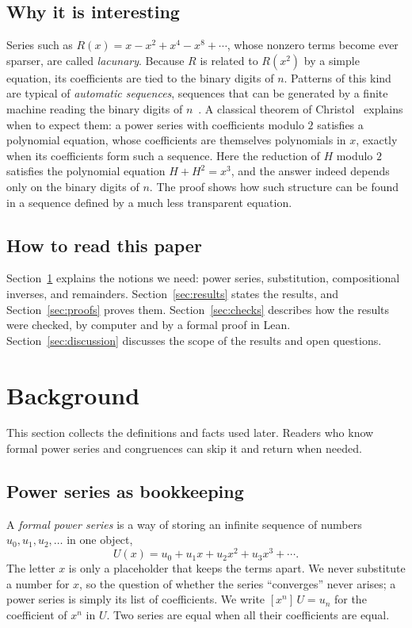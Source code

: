 \documentclass[11pt,a4paper]{article}
\theoremstyle{definition}
\theoremstyle{remark}
\newcommand{\coeff}[2]{[x^{#1}]\,#2}
\begin{document}
\subsection{Why it is interesting}
Series such as $R(x)=x-x^2+x^4-x^8+\cdots$, whose nonzero terms become ever sparser, are called \emph{lacunary}. Because
$R$ is related to $R(x^2)$ by a simple equation, its coefficients are tied to the binary digits of $n$. Patterns of this
kind are typical of \emph{automatic sequences}, sequences that can be generated by a finite machine reading the binary
digits of $n$~\cite{allouche}. A classical theorem of Christol~\cite{christol} explains when to expect them: a power series
with coefficients modulo $2$ satisfies a polynomial equation, whose coefficients are themselves polynomials in $x$,
exactly when its coefficients form such a sequence. Here
the reduction of $H$ modulo $2$ satisfies the polynomial equation $H+H^2=x^3$, and the answer indeed depends only on the
binary digits of $n$. The proof shows how such structure can be found in a sequence defined by a much less transparent
equation.

\subsection{How to read this paper}
Section~\ref{sec:background} explains the notions we need: power series, substitution, compositional inverses, and
remainders. Section~\ref{sec:results} states the results, and Section~\ref{sec:proofs} proves them.
Section~\ref{sec:checks} describes how the results were checked, by computer and by a formal proof in Lean.
Section~\ref{sec:discussion} discusses the scope of the results and open questions.
\section{Background}\label{sec:background}
This section collects the definitions and facts used later. Readers who know formal power series and congruences can skip it and return when needed.
\subsection{Power series as bookkeeping}
A \emph{formal power series} is a way of storing an infinite sequence of numbers $u_0,u_1,u_2,\dots$ in one object,
\[
U(x)=u_0+u_1x+u_2x^2+u_3x^3+\cdots .
\]
The letter $x$ is only a placeholder that keeps the terms apart. We never substitute a number for $x$, so the question
of whether the series ``converges'' never arises; a power series is simply its list of coefficients. We write
$\coeff{n}{U}=u_n$ for the coefficient of $x^n$ in $U$. Two series are equal when all their coefficients are equal.
\end{document}
